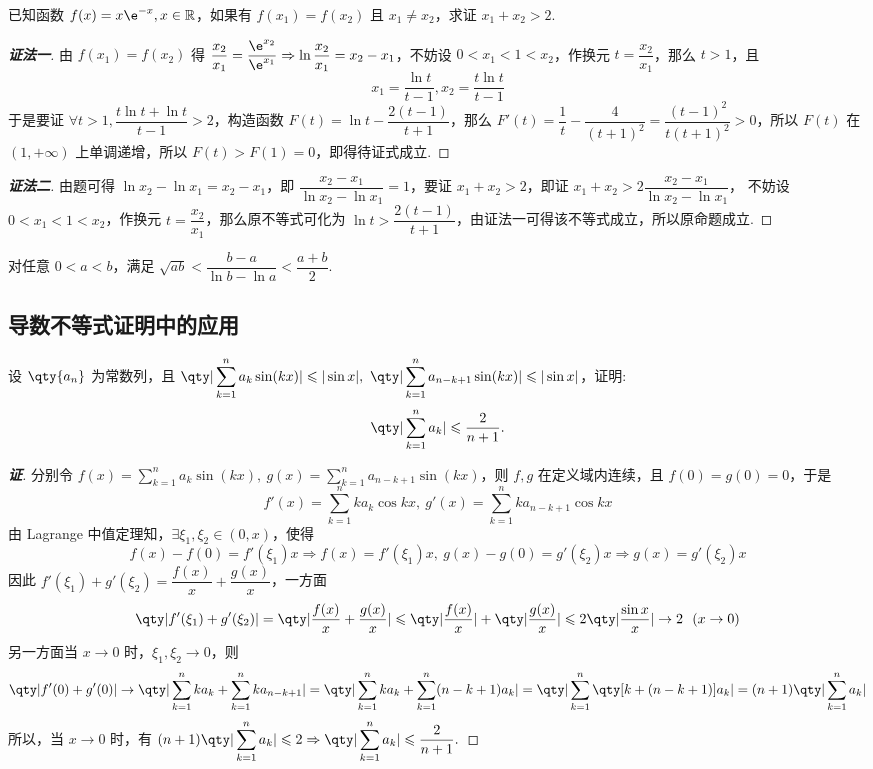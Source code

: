 \begin{example}
    已知函数 $f(x)=x\e^{-x},x\in\mathbb{R}$，如果有 $f(x_1)=f(x_2)$ 且 $x_1\neq x_2$，求证 $x_1+x_2>2.$
\end{example}
\begin{proof}[{\songti \textbf{证法一}}]
    由 $f(x_1)=f(x_2)$ 得 $\dfrac{x_2}{x_1}=\dfrac{\e^{x_2}}{\e^{x_1}}\Rightarrow \ln\dfrac{x_2}{x_1}=x_2-x_1$，不妨设 $0<x_1<1<x_2$，作换元 $t=\dfrac{x_2}{x_1}$，那么 $t>1$，且 
    $$x_1=\dfrac{\ln t}{t-1},x_2=\dfrac{t\ln t}{t-1}$$
    于是要证 $\forall t>1,\dfrac{t\ln t+\ln t}{t-1}>2$，构造函数 $F(t)=\ln t-\dfrac{2(t-1)}{t+1}$，那么 $F'(t)=\dfrac{1}{t}-\dfrac{4}{(t+1)^2}=\dfrac{(t-1)^2}{t(t+1)^2}>0$，所以 $F(t)$ 在 $(1,+\infty)$ 上单调递增，所以 $F(t)>F(1)=0$，即得待证式成立.
\end{proof}
\begin{proof}[{\songti \textbf{证法二}}]
    由题可得 $\ln x_2-\ln x_1=x_2-x_1$，即 $\dfrac{x_2-x_1}{\ln x_2-\ln x_1}=1$，要证 $x_1+x_2>2$，即证 $x_1+x_2>2\dfrac{x_2-x_1}{\ln x_2-\ln x_1}$，
    不妨设 $0<x_1<1<x_2$，作换元 $t=\dfrac{x_2}{x_1}$，那么原不等式可化为 $\ln t>\dfrac{2(t-1)}{t+1}$，由证法一可得该不等式成立，所以原命题成立.
\end{proof}

\begin{theorem}
    对任意 $0<a<b$，满足 $\sqrt{ab}<\dfrac{b-a}{\ln b-\ln a}<\dfrac{a+b}{2}.$
\end{theorem}

\subsection{导数不等式证明中的应用}

\begin{example}
    设 $\qty{a_n}$ 为常数列，且 $\displaystyle\qty|\sum_{k=1}^{n}a_k\sin(kx)|\leqslant |\sin x|,~\qty|\sum_{k=1}^{n}a_{n-k+1}\sin(kx)|\leqslant |\sin x|$，证明: $$\displaystyle \qty|\sum_{k=1}^{n}a_k|\leqslant \dfrac{2}{n+1}.$$
\end{example}
\begin{proof}[{\songti \textbf{证}}]
    分别令 $\displaystyle f(x)=\sum_{k=1}^{n}a_k\sin(kx),~g(x)=\sum_{k=1}^{n}a_{n-k+1}\sin(kx)$，则 $f,g$ 在定义域内连续，且 $f(0)=g(0)=0$，于是
    $$f'(x)=\sum_{k=1}^{n}ka_k\cos kx,~g'(x)=\sum_{k=1}^{n}ka_{n-k+1}\cos kx$$
    由 Lagrange 中值定理知，$\exists\xi_1,\xi_2\in(0,x)$，使得
    $$f(x)-f(0)=f'(\xi_1)x\Rightarrow f(x)=f'(\xi_1)x,~g(x)-g(0)=g'(\xi_2)x\Rightarrow g(x)=g'(\xi_2)x$$
    因此 $f'(\xi_1)+g'(\xi_2)=\dfrac{f(x)}{x}+\dfrac{g(x)}{x}$，一方面
    $$\qty|f'(\xi_1)+g'(\xi_2)|=\qty|\dfrac{f(x)}{x}+\dfrac{g(x)}{x}|\leqslant \qty|\dfrac{f(x)}{x}|+\qty|\dfrac{g(x)}{x}|\leqslant 2\qty|\dfrac{\sin x}{x}|\to 2~~(x\to0)$$
    另一方面当 $x\to0$ 时，$\xi_1,\xi_2\to0$，则
    $$\qty|f'(0)+g'(0)|\to\qty|\sum_{k=1}^{n}ka_k+\sum_{k=1}^{n}ka_{n-k+1}|=\qty|\sum_{k=1}^{n}ka_k+\sum_{k=1}^{n}(n-k+1)a_k|=\qty|\sum_{k=1}^{n}\qty[k+(n-k+1)]a_k|=(n+1)\qty|\sum_{k=1}^{n}a_k|$$
    所以，当 $x\to0$ 时，有 $\displaystyle (n+1)\qty|\sum_{k=1}^{n}a_k|\leqslant 2\Rightarrow \qty|\sum_{k=1}^{n}a_k|\leqslant \dfrac{2}{n+1}.$
\end{proof}

